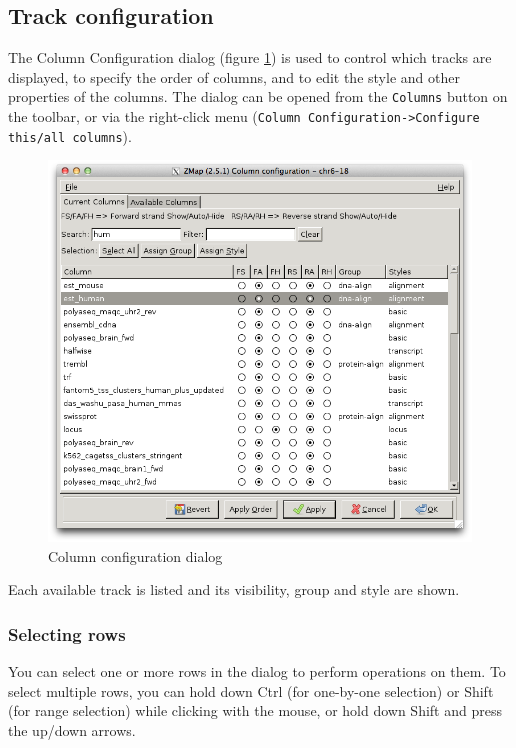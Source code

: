 \documentclass[letterpaper]{article}
\begin{document}
\subsection{Track configuration} \label{sec_track_configuration}
The Column Configuration dialog (figure \ref{img_columns}) is used to control which tracks are displayed, to specify the order of columns, and to edit the style and other properties of the columns.  The dialog can be opened from the \lstinline{Columns} button on the toolbar, or via the right-click menu (\lstinline{Column Configuration->Configure this/all columns}).

\begin{figure}
\centering
\color[rgb]{0.30980393,0.5058824,0.7411765}
\includegraphics[resolution=150]{images/columns.png}
\caption{Column configuration dialog}
\label{img_columns}
\end{figure}

Each available track is listed and its visibility, group and style are shown.

\subsubsection{Selecting rows}
You can select one or more rows in the dialog to perform operations on them. To select multiple rows, you can hold down Ctrl (for one-by-one selection) or Shift (for range selection) while clicking with the mouse, or hold down Shift and press the up/down arrows.
\end{document}
